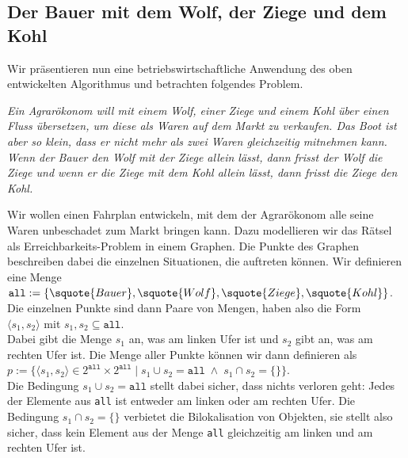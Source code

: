 \subsection{Der Bauer mit dem Wolf, der Ziege und dem Kohl}
Wir pr\"{a}sentieren nun eine betriebswirtschaftliche Anwendung des oben entwickelten Algorithmus und
betrachten folgendes Problem.
\vspace*{0.3cm}

\begin{minipage}[c]{14cm}
{\sl
Ein Agrar\"{o}konom will mit einem Wolf, einer Ziege und einem Kohl \"{u}ber einen Fluss \"{u}bersetzen, um
diese als Waren auf dem Markt zu verkaufen.
Das Boot ist aber so klein, dass er nicht mehr als zwei Waren gleichzeitig mitnehmen kann.
Wenn der Bauer den Wolf mit der Ziege allein l\"{a}sst, dann frisst der Wolf die Ziege und wenn er die
Ziege mit dem Kohl allein l\"{a}sst, dann frisst die Ziege den Kohl. }
\end{minipage}
\vspace*{0.3cm}

\noindent
Wir wollen einen Fahrplan entwickeln, mit dem der Agrar\"{o}konom alle seine Waren unbeschadet zum
Markt bringen kann.  Dazu modellieren wir das R\"{a}tsel als Erreichbarkeits-Problem in einem
Graphen.  
Die Punkte des Graphen beschreiben dabei die einzelnen Situationen, die auftreten
k\"{o}nnen.  Wir definieren eine Menge\\[0.2cm]
\hspace*{1.3cm} 
$\texttt{all} := \{ \squote{Bauer}, \squote{Wolf}, \squote{Ziege},\squote{Kohl} \}$.
\\[0.2cm]
Die einzelnen Punkte sind dann Paare von Mengen, haben also die Form \\[0.2cm]
\hspace*{1.3cm} 
$\langle s_1, s_2 \rangle$ \quad mit $s_1,s_2 \subseteq \texttt{all}$.
\\[0.2cm]
Dabei gibt die Menge $s_1$ an, was am linken Ufer ist und $s_2$ gibt an, was am rechten
Ufer ist.  Die Menge aller Punkte k\"{o}nnen wir dann definieren als \\[0.2cm]
\hspace*{1.3cm} 
$p := \bigl\{ \langle s_1, s_2 \rangle \in 2^\texttt{all} \times 2^\texttt{all} \;|\;
              s_1 \cup s_2 = \texttt{all} \;\wedge\; s_1 \cap s_2 = \{\} 
      \bigr\}
$.
\\[0.2cm]
Die Bedingung $s_1 \cup s_2 = \texttt{all}$ stellt dabei sicher, dass nichts verloren
geht:  Jedes der Elemente aus \texttt{all} ist entweder am linken oder am rechten Ufer.
Die Bedingung $s_1 \cap s_2 = \{\}$ verbietet die Bilokalisation von Objekten, sie stellt also sicher,
dass kein Element aus der Menge \texttt{all}  gleichzeitig am  linken und am rechten Ufer ist.

